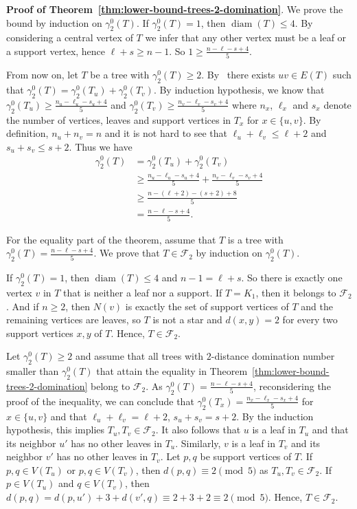 \documentclass[12pt]{article}
\DeclareMathOperator{\diam}{diam}
\newcommand{\F}{\mathcal{F}}
\begin{document}
\medskip\noindent 
{\bf Proof of Theorem~\ref{thm:lower-bound-trees-2-domination}}. 
    We prove the bound by induction on $\gamma_2^0(T)$. If $\gamma_2^0(T) = 1$, then $\diam(T) \leq 4$. By considering a central vertex of $T$ we infer that any other vertex must be a leaf or a support vertex, hence $\ell + s \geq n-1$. So $1 \geq \frac{n-\ell-s+4}{5}$. 
    
    From now on, let $T$ be a tree with $\gamma_2^0(T) \geq 2$. By~\cite[Lemma 2.1]{Meierling-2005} there exists $uv \in E(T)$ such that $\gamma_2^0(T) = \gamma_2^0(T_u) + \gamma_2^0(T_v)$. By induction hypothesis, we know that $\gamma_2^0(T_u) \geq \frac{n_u-\ell_u-s_u+4}{5}$ and $\gamma_2^0(T_v) \geq \frac{n_v-\ell_v-s_v+4}{5}$ where $n_x$, $\ell_x$ and $s_x$ denote the number of vertices, leaves and support vertices in $T_x$ for $x \in \{u,v\}$. By definition, $n_u + n_v = n$ and it is not hard to see that $\ell_u + \ell_v \leq \ell + 2$ and $s_u + s_v \leq s + 2$. Thus we have
    \begin{align*}
        \gamma_2^0(T) & = \gamma_2^0(T_u) + \gamma_2^0(T_v)\\
        & \geq \frac{n_u-\ell_u-s_u+4}{5} + \frac{n_v-\ell_v-s_v+4}{5}\\
        & \geq \frac{n - (\ell + 2) - (s+2) + 8}{5}\\
        & = \frac{n-\ell-s+4}{5}. 
    \end{align*}

For the equality part of the theorem, assume that $T$ is a tree with $\gamma_2^0(T) = \frac{n-\ell-s+4}{5}$. We prove that $T \in \F_2$ by induction on $\gamma_2^0(T)$.

    If $\gamma_2^0(T) = 1$, then $\diam(T) \leq 4$ and $n-1=\ell+s$. So there is exactly one vertex $v$ in $T$ that is neither a leaf nor a support. If $T=K_1$, then it belongs to $\F_2$. And if $n \geq 2$, then $N(v)$ is exactly the set of support vertices of $T$ and the remaining vertices are leaves, so $T$ is not a star and $d(x,y) = 2$ for every two support vertices $x,y$ of $T$. Hence, $T \in \F_2$. 

    Let $\gamma_2^0(T) \geq 2$ and assume that all trees with $2$-distance domination number smaller than $\gamma_2^0(T)$ that attain the equality in Theorem~\ref{thm:lower-bound-trees-2-domination} belong to $\F_2$. As $\gamma_2^0(T) = \frac{n-\ell-s+4}{5}$, reconsidering the proof of the inequality,
    we can conclude that $\gamma_2^0(T_x) = \frac{n_x-\ell_x-s_x+4}{5}$ for $x \in \{u,v\}$ and that $\ell_u + \ell_v = \ell + 2$, $s_u + s_v = s + 2$. By the induction hypothesis, this implies $T_u, T_v \in \F_2$. It also follows that $u$ is a leaf in $T_u$ and that its neighbor $u'$ has no other leaves in $T_u$. Similarly, $v$ is a leaf in $T_v$ and its neighbor $v'$ has no other leaves in $T_v$. Let $p,q$ be support vertices of $T$. If $p,q \in V(T_u)$ or $p,q \in V(T_v)$, then $d(p,q) \equiv 2 \pmod{5}$ as $T_u, T_v \in \F_2$. If $p \in V(T_u)$ and $q \in V(T_v)$, then $d(p,q) = d(p,u') + 3 + d(v',q) \equiv 2 + 3 + 2 \equiv 2 \pmod{5}$. Hence, $T \in \F_2$.
\end{document}
